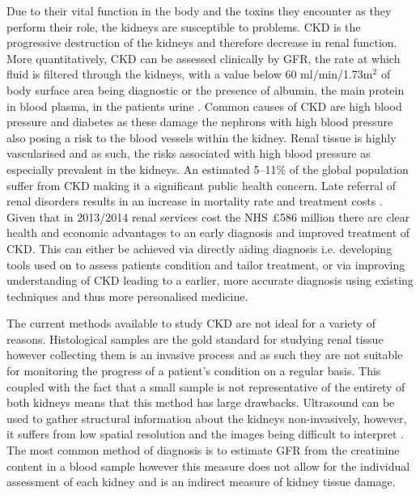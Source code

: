 Due to their vital function in the body and the toxins they encounter as they perform their role, the kidneys are susceptible to problems. \ac{CKD} is the progressive destruction of the kidneys and therefore decrease in renal function. More quantitatively, \ac{CKD} can be assessed clinically by \ac{GFR}, the rate at which fluid is filtered through the kidneys, with a value below 60 ml/min/1.73m$^2$ of body surface area being diagnostic or the presence of albumin, the main protein in blood plasma, in the patients urine \cite{stevens_assessing_2006, farrugia_albumin_2010, pruijm_blood_2017}. Common causes of \ac{CKD} are high blood pressure and diabetes as these damage the nephrons with high blood pressure also posing a risk to the blood vessels within the kidney. Renal tissue is highly vascularised and as such, the risks associated with high blood pressure as especially prevalent in the kidneys. An estimated 5–11\% of the global population suffer from \ac{CKD} \cite{coresh_prevalence_2003, de_lusignan_identifying_2005, drey_population-based_2003, amato_prevalence_2005, chadban_prevalence_2003} making it a significant public health concern. Late referral of renal disorders results in an increase in mortality rate and treatment costs \cite{jungers_late_1993, sesso_late_1996, klebe_cost_2007}. Given that in 2013/2014 renal services cost the \ac{NHS} \pounds 586 million \cite{precious_nhs_2015} there are clear health and economic advantages to an early diagnosis and improved treatment of \ac{CKD}. This can either be achieved via directly aiding diagnosis i.e. developing tools used on to assess patients condition and tailor treatment, or via improving understanding of \ac{CKD} leading to a earlier, more accurate diagnosis using existing techniques and thus more personalised medicine.

The current methods available to study \ac{CKD} are not ideal for a variety of reasons. Histological samples are the gold standard for studying renal tissue however collecting them is an invasive process and as such they are not suitable for monitoring the progress of a patient's condition on a regular basis. This coupled with the fact that a small sample is not representative of the entirety of both kidneys means that this method  has large drawbacks. Ultrasound can be used to gather structural information about the kidneys non-invasively, however, it suffers from low spatial resolution and the images being difficult to interpret \cite{hansen_ultrasonography_2015}. The most common method of diagnosis is to estimate \ac{GFR} from the creatinine content in a blood sample however this measure does not allow for the individual assessment of each kidney and is an indirect measure of kidney tissue damage.

